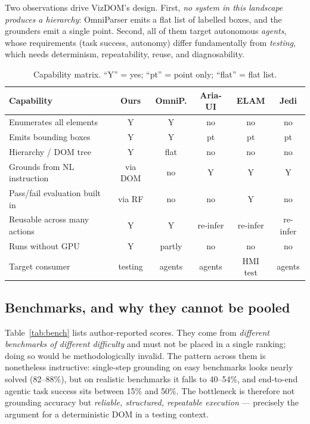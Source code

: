 \documentclass[11pt,a4paper]{article}
\begin{document}
Two observations drive VizDOM's design. First, \emph{no system in this landscape
produces a hierarchy}: OmniParser emits a flat list of labelled boxes, and the
grounders emit a single point. Second, all of them target autonomous \emph{agents},
whose requirements (task success, autonomy) differ fundamentally from
\emph{testing}, which needs determinism, repeatability, reuse, and diagnosability.

\begin{table}[H]
  \centering\footnotesize
  \caption{Capability matrix. ``Y'' = yes; ``pt'' = point only; ``flat'' = flat list.}
  \label{tab:capability}
  \begin{tabular}{@{}p{5.2cm}ccccc@{}}
    \toprule
    Capability & Ours & OmniP. & Aria-UI & ELAM & Jedi \\
    \midrule
    Enumerates all elements & Y & Y & no & no & no \\
    Emits bounding boxes & Y & Y & pt & pt & pt \\
    Hierarchy / DOM tree & Y & flat & no & no & no \\
    Grounds from NL instruction & via DOM & no & Y & Y & Y \\
    Pass/fail evaluation built in & via RF & no & no & Y & no \\
    Reusable across many actions & Y & Y & re-infer & re-infer & re-infer \\
    Runs without GPU & Y & partly & no & no & no \\
    Target consumer & testing & agents & agents & HMI test & agents \\
    \bottomrule
  \end{tabular}
\end{table}

\subsection{Benchmarks, and why they cannot be pooled}
Table~\ref{tab:bench} lists author-reported scores. They come from \emph{different
benchmarks of different difficulty} and must not be placed in a single ranking;
doing so would be methodologically invalid. The pattern across them is nonetheless
instructive: single-step grounding on easy benchmarks looks nearly solved
(82--88\%), but on realistic benchmarks it falls to 40--54\%, and end-to-end agentic
task success sits between 15\% and 50\%. The bottleneck is therefore not grounding
accuracy but \emph{reliable, structured, repeatable execution} --- precisely the
argument for a deterministic DOM in a testing context.
\end{document}
